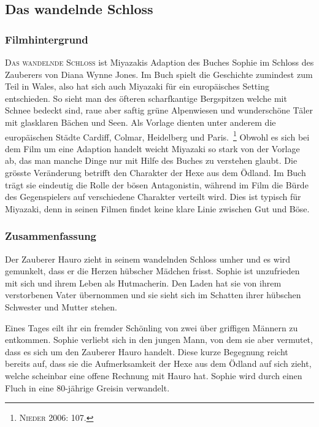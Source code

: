 \subsection{Das wandelnde Schloss}

\subsubsection{Filmhintergrund}
\textsc{Das wandelnde Schloss} ist Miyazakis Adaption des Buches \glqq Sophie im Schloss des Zauberers \grqq von Diana Wynne Jones. Im Buch spielt die Geschichte zumindest zum Teil in Wales, also hat sich auch Miyazaki für ein europäisches Setting entschieden. So sieht man des öfteren scharfkantige Bergspitzen welche mit Schnee bedeckt sind, raue aber saftig grüne Alpenwiesen und wunderschöne Täler mit glasklaren Bächen und Seen. Als Vorlage dienten unter anderem die europäischen Städte Cardiff, Colmar, Heidelberg und Paris.~\footnote{\textsc{Nieder} 2006: 107.} Obwohl es sich bei dem Film um eine Adaption handelt weicht Miyazaki so stark von der Vorlage ab, das man manche Dinge nur mit Hilfe des Buches zu verstehen glaubt. Die grösste Veränderung betrifft den Charakter der Hexe aus dem Ödland. Im Buch trägt sie eindeutig die Rolle der bösen Antagonistin, während im Film die Bürde des Gegenspielers auf verschiedene Charakter verteilt wird. Dies ist typisch für Miyazaki, denn in seinen Filmen findet keine klare Linie zwischen Gut und Böse. 

\subsubsection{Zusammenfassung}
Der Zauberer Hauro zieht in seinem wandelnden Schloss umher und es wird gemunkelt, dass er die Herzen hübscher Mädchen frisst. Sophie ist unzufrieden mit sich und ihrem Leben als Hutmacherin. Den Laden hat sie von ihrem verstorbenen Vater übernommen und sie sieht sich im Schatten ihrer hübschen Schwester und Mutter stehen. 

Eines Tages eilt ihr ein fremder Schönling von zwei über griffigen Männern zu entkommen. Sophie verliebt sich in den jungen Mann, von dem sie aber vermutet, dass es sich um den Zauberer Hauro handelt. Diese kurze Begegnung reicht bereits auf, dass sie die Aufmerksamkeit der Hexe aus dem Ödland auf sich zieht, welche scheinbar eine offene Rechnung mit Hauro hat. Sophie wird durch einen Fluch in eine 80-jährige Greisin verwandelt. 


